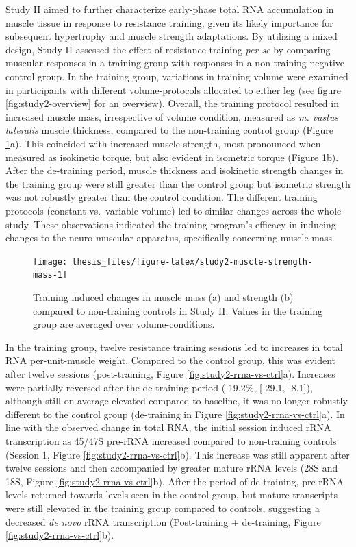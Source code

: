 \documentclass[twoside,10pt]{gihclass} %
\begin{document}
Study II aimed to further characterize early-phase total RNA accumulation in muscle tissue in response to resistance training, given its likely importance for subsequent hypertrophy and muscle strength adaptations.
By utilizing a mixed design, Study II assessed the effect of resistance training \emph{per se} by comparing muscular responses in a training group with responses in a non-training negative control group. In the training group, variations in training volume were examined in participants with different volume-protocols allocated to either leg (see figure \ref{fig:study2-overview} for an overview). Overall, the training protocol resulted in increased muscle mass, irrespective of volume condition, measured as \emph{m. vastus lateralis} muscle thickness, compared to the non-training control group (Figure \ref{fig:study2-muscle-strength-mass}a). This coincided with increased muscle strength, most pronounced when measured as isokinetic torque, but also evident in isometric torque (Figure \ref{fig:study2-muscle-strength-mass}b).
After the de-training period, muscle thickness and isokinetic strength changes in the training group were still greater than the control group but isometric strength was not robustly greater than the control condition.
The different training protocols (constant vs.~variable volume) led to similar changes across the whole study.
These observations indicated the training program's efficacy in inducing changes to the neuro-muscular apparatus, specifically concerning muscle mass.
\begin{figure}

{\centering \texttt{[image: thesis\_files/figure-latex/study2-muscle-strength-mass-1]} 

}

\caption[Muscle mass and strength changes in Study II]{Training induced changes in muscle mass (a) and strength (b) compared to non-training controls in Study II. Values in the training group are averaged over volume-conditions.}\label{fig:study2-muscle-strength-mass}
\end{figure}
In the training group, twelve resistance training sessions led to increases in total RNA per-unit-muscle weight. Compared to the control group, this was evident after twelve sessions (post-training, Figure \ref{fig:study2-rrna-vs-ctrl}a).
Increases were partially reversed after the de-training period (-19.2\%, {[}-29.1, -8.1{]}), although still on average elevated compared to baseline, it was no longer robustly different to the control group (de-training in Figure \ref{fig:study2-rrna-vs-ctrl}a).
In line with the observed change in total RNA, the initial session induced rRNA transcription as 45/47S pre-rRNA increased compared to non-training controls (Session 1, Figure \ref{fig:study2-rrna-vs-ctrl}b). This increase was still apparent after twelve sessions and then accompanied by greater mature rRNA levels (28S and 18S, Figure \ref{fig:study2-rrna-vs-ctrl}b). After the period of de-training, pre-rRNA levels returned towards levels seen in the control group, but mature transcripts were still elevated in the training group compared to controls, suggesting a decreased \emph{de novo} rRNA transcription (Post-training + de-training, Figure \ref{fig:study2-rrna-vs-ctrl}b).
\end{document}

